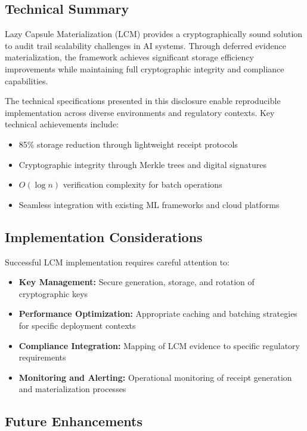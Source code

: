 \documentclass[12pt,a4paper]{article}
\begin{document}
\subsection{Technical Summary}

Lazy Capsule Materialization (LCM) provides a cryptographically sound solution to audit trail scalability challenges in AI systems. Through deferred evidence materialization, the framework achieves significant storage efficiency improvements while maintaining full cryptographic integrity and compliance capabilities.

The technical specifications presented in this disclosure enable reproducible implementation across diverse environments and regulatory contexts. Key technical achievements include:

\begin{itemize}
\item 85\% storage reduction through lightweight receipt protocols
\item Cryptographic integrity through Merkle trees and digital signatures  
\item $O(\log n)$ verification complexity for batch operations
\item Seamless integration with existing ML frameworks and cloud platforms
\end{itemize}

\subsection{Implementation Considerations}

Successful LCM implementation requires careful attention to:

\begin{itemize}
\item \textbf{Key Management:} Secure generation, storage, and rotation of cryptographic keys
\item \textbf{Performance Optimization:} Appropriate caching and batching strategies for specific deployment contexts
\item \textbf{Compliance Integration:} Mapping of LCM evidence to specific regulatory requirements
\item \textbf{Monitoring and Alerting:} Operational monitoring of receipt generation and materialization processes
\end{itemize}

\subsection{Future Enhancements}
\end{document}
